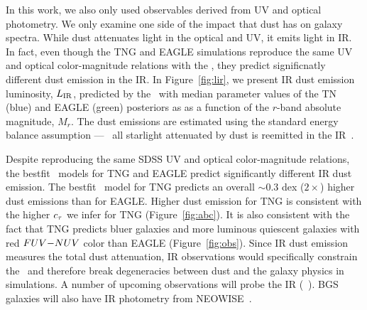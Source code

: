 In this work, we also only used observables derived from UV and optical
photometry. We only examine one side of the impact that dust has on galaxy
spectra. While dust attenuates light in the optical and UV, it emits light in
IR. In fact, even though the TNG and EAGLE simulations reproduce the same UV and
optical color-magnitude relations with the \eda, they predict significnatly 
different dust emission in the IR. In Figure~\ref{fig:lir}, we present IR dust
emission luminosity, $L_{\rm IR}$, predicted by the \eda~with median parameter values of 
the TN (blue) and EAGLE (green) posteriors as as a function of the $r$-band 
absolute magnitude, $M_r$. The dust emissions are estimated using the standard
energy balance assumption --- \ie~all starlight attenuated by dust is reemitted 
in the IR~\citep{dacunha2008}. 

Despite reproducing the same SDSS UV and optical color-magnitude relations, the
bestfit \eda~models for TNG and EAGLE predict significantly different IR dust
emission. The bestfit \eda~model for TNG predicts an overall ${\sim}0.3$ dex
($2\times$) higher dust emissions than for EAGLE. Higher dust emission for TNG
is consistent with the higher $c_\tau$ we infer for TNG (Figure~\ref{fig:abc}).
It is also consistent with the fact that TNG predicts bluer galaxies and more
luminous quiescent galaxies with red $FUV{-}NUV$ color than EAGLE
(Figure~\ref{fig:obs}). Since IR dust emission measures the total dust
attenuation, IR observations would specifically constrain the \eda~and
therefore break degeneracies between dust and the galaxy physics in simulations.
A number of upcoming observations will probe the IR (\eg~). BGS galaxies will also have IR photometry from
NEOWISE~\citep{meisner2018}. 




